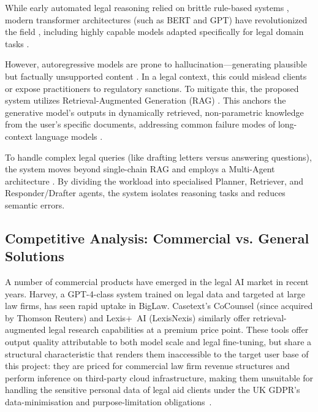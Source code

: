 \documentclass[11pt,a4paper]{article}
\begin{document}
While early automated legal reasoning relied on brittle rule-based systems \cite{mccarty1977}, modern transformer architectures (such as BERT and GPT) have revolutionized the field \cite{vaswani2017, devlin2019, brown2020}, including highly capable models adapted specifically for legal domain tasks \cite{chalkidis2020,lexglue2021,guha2023}.\par
However, autoregressive models are prone to hallucination---generating plausible but factually unsupported content \cite{maynez2020, ji2023}. In a legal context, this could mislead clients or expose practitioners to regulatory sanctions. To mitigate this, the proposed system utilizes Retrieval-Augmented Generation (RAG) \cite{lewis2020}. This anchors the generative model's outputs in dynamically retrieved, non-parametric knowledge from the user's specific documents, addressing common failure modes of long-context language models \cite{liu2023}.\par
To handle complex legal queries (like drafting letters versus answering questions), the system moves beyond single-chain RAG and employs a Multi-Agent architecture \cite{wu2023}. By dividing the workload into specialised Planner, Retriever, and Responder/Drafter agents, the system isolates reasoning tasks and reduces semantic errors.

\subsection{Competitive Analysis: Commercial vs. General Solutions}

A number of commercial products have emerged in the legal AI market in recent years. Harvey,
a GPT-4-class system trained on legal data and targeted at large law firms, has seen rapid
uptake in BigLaw. Casetext's
CoCounsel (since acquired by Thomson Reuters) and Lexis+~AI (LexisNexis) similarly offer
retrieval-augmented legal research capabilities at a premium price point.
These tools offer output quality attributable to both model scale and legal fine-tuning, but
share a structural characteristic that renders them inaccessible to the target user base of
this project: they are priced for commercial law firm revenue structures and perform inference
on third-party cloud infrastructure, making them unsuitable for handling the sensitive personal
data of legal aid clients under the UK GDPR's data-minimisation and purpose-limitation
obligations~\cite{ukgdpr_art5_2018,ico_purpose_limitation_2024,ico_data_minimisation_2024}.
\end{document}

